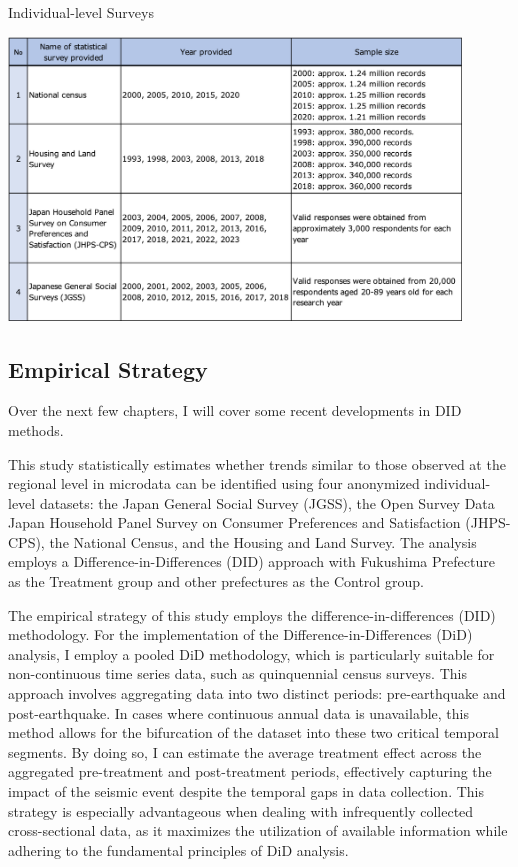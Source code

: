 \documentclass[12pt,halfline,a4paper]{ouparticle}
\begin{document}
\begin{table}[h]
    \centering
    \caption{Individual-level Surveys}
    \label{tab:annual_income}
    \includegraphics[width=0.9\textwidth]{Statistical surveys.png}  %
\end{table}

\newpage

\subsection{Empirical Strategy}
\label{sec5.1}

Over the next few chapters, I will cover some recent developments in DID methods. 


This study statistically estimates whether trends similar to those observed at the regional level in microdata can be identified using four anonymized individual-level datasets: the Japan General Social Survey (JGSS), the Open Survey Data Japan Household Panel Survey on Consumer Preferences and Satisfaction (JHPS-CPS), the National Census, and the Housing and Land Survey. The analysis employs a Difference-in-Differences (DID) approach with Fukushima Prefecture as the Treatment group and other prefectures as the Control group.

The empirical strategy of this study employs the difference-in-differences (DID) methodology. For the implementation of the Difference-in-Differences (DiD) analysis, I employ a pooled DiD methodology, which is particularly suitable for non-continuous time series data, such as quinquennial census surveys. This approach involves aggregating data into two distinct periods: pre-earthquake and post-earthquake. In cases where continuous annual data is unavailable, this method allows for the bifurcation of the dataset into these two critical temporal segments. By doing so, I can estimate the average treatment effect across the aggregated pre-treatment and post-treatment periods, effectively capturing the impact of the seismic event despite the temporal gaps in data collection. This strategy is especially advantageous when dealing with infrequently collected cross-sectional data, as it maximizes the utilization of available information while adhering to the fundamental principles of DiD analysis.
\end{document}
